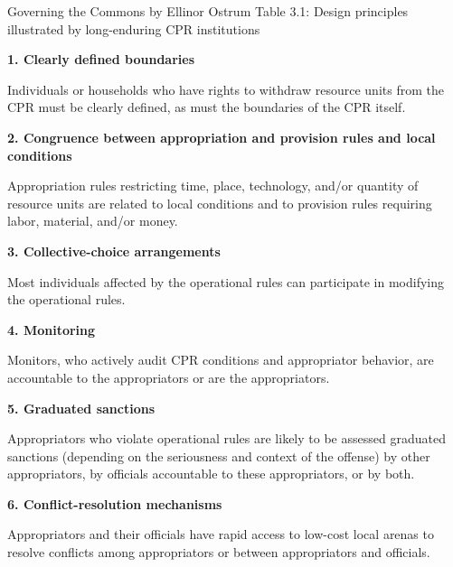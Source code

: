\documentclass{article}
\begin{document}
\vspace{0.2cm}

Governing the Commons by Ellinor Ostrum Table 3.1: Design principles illustrated by long-enduring CPR institutions

\vspace{0.2cm}

\textbf{1. Clearly defined boundaries}

Individuals or households who have rights to withdraw resource units from the CPR must be clearly defined, as must the boundaries of the CPR itself.

\vspace{0.2cm}

\textbf{2. Congruence between appropriation and provision rules and local conditions}

 Appropriation rules restricting time, place, technology, and/or quantity of resource units are related to local conditions and to provision rules requiring labor, material, and/or money.

\vspace{0.2cm}

\textbf{3. Collective-choice arrangements}

Most individuals affected by the operational rules can participate in modifying the operational rules.


\vspace{0.2cm}

\textbf{4. Monitoring}

Monitors, who actively audit CPR conditions and appropriator behavior, are accountable to the appropriators or are the appropriators.

\vspace{0.2cm}

\textbf{5. Graduated sanctions}

Appropriators who violate operational rules are likely to be assessed graduated sanctions (depending on the seriousness and context of the offense) by other appropriators, by officials accountable to these appropriators, or by both.

\vspace{0.2cm}

\textbf{6. Conflict-resolution mechanisms}

Appropriators and their officials have rapid access to low-cost local arenas to resolve conflicts among appropriators or between appropriators and officials.

\vspace{0.2cm}
\end{document}
